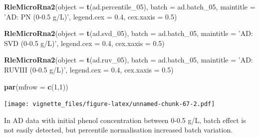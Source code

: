 \documentclass[]{book}
\newenvironment{Shaded}{\begin{snugshade}}{\end{snugshade}}
\newcommand{\KeywordTok}[1]{\textcolor[rgb]{0.13,0.29,0.53}{\textbf{#1}}}
\newcommand{\DataTypeTok}[1]{\textcolor[rgb]{0.13,0.29,0.53}{#1}}
\newcommand{\DecValTok}[1]{\textcolor[rgb]{0.00,0.00,0.81}{#1}}
\newcommand{\FloatTok}[1]{\textcolor[rgb]{0.00,0.00,0.81}{#1}}
\newcommand{\StringTok}[1]{\textcolor[rgb]{0.31,0.60,0.02}{#1}}
\newcommand{\NormalTok}[1]{#1}
\begin{document}
\begin{Shaded}
\begin{Highlighting}[]
\KeywordTok{RleMicroRna2}\NormalTok{(}\DataTypeTok{object =} \KeywordTok{t}\NormalTok{(ad.percentile_}\DecValTok{05}\NormalTok{), }\DataTypeTok{batch =}\NormalTok{ ad.batch_}\DecValTok{05}\NormalTok{, }
             \DataTypeTok{maintitle =} \StringTok{'AD: PN (0-0.5 g/L)'}\NormalTok{, }\DataTypeTok{legend.cex =} \FloatTok{0.4}\NormalTok{, }
             \DataTypeTok{cex.xaxis =} \FloatTok{0.5}\NormalTok{)}

\KeywordTok{RleMicroRna2}\NormalTok{(}\DataTypeTok{object =} \KeywordTok{t}\NormalTok{(ad.svd_}\DecValTok{05}\NormalTok{), }\DataTypeTok{batch =}\NormalTok{ ad.batch_}\DecValTok{05}\NormalTok{, }
             \DataTypeTok{maintitle =} \StringTok{'AD: SVD (0-0.5 g/L)'}\NormalTok{, }\DataTypeTok{legend.cex =} \FloatTok{0.4}\NormalTok{, }
             \DataTypeTok{cex.xaxis =} \FloatTok{0.5}\NormalTok{)}

\KeywordTok{RleMicroRna2}\NormalTok{(}\DataTypeTok{object =} \KeywordTok{t}\NormalTok{(ad.ruv_}\DecValTok{05}\NormalTok{), }\DataTypeTok{batch =}\NormalTok{ ad.batch_}\DecValTok{05}\NormalTok{, }
             \DataTypeTok{maintitle =} \StringTok{'AD: RUVIII (0-0.5 g/L)'}\NormalTok{, }\DataTypeTok{legend.cex =} \FloatTok{0.4}\NormalTok{, }
             \DataTypeTok{cex.xaxis =} \FloatTok{0.5}\NormalTok{)}

\KeywordTok{par}\NormalTok{(}\DataTypeTok{mfrow =} \KeywordTok{c}\NormalTok{(}\DecValTok{1}\NormalTok{,}\DecValTok{1}\NormalTok{))}
\end{Highlighting}
\end{Shaded}

\texttt{[image: vignette\_files/figure-latex/unnamed-chunk-67-2.pdf]}

In AD data with initial phenol concentration between 0-0.5 g/L, batch
effect is not easily detected, but percentile normalisation increased
batch variation.
\end{document}
